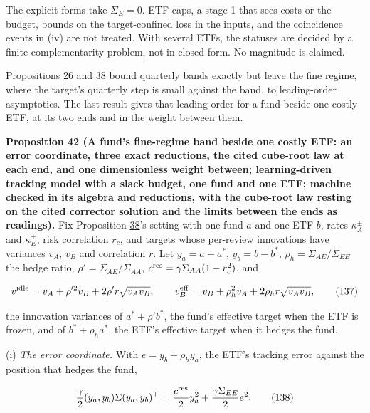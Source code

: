 \documentclass[11pt]{article}
\begin{document}
The explicit forms take \(\Sigma_E=0\). ETF caps, a stage 1 that sees costs or
the budget, bounds on the target-confined loss in the inputs, and the
coincidence events in (iv) are not treated. With several ETFs, the
statuses are decided by a finite complementarity problem, not in
closed form. No magnitude is claimed.

Propositions \hyperref[res:Proposition-26]{26} and \hyperref[res:Proposition-38]{38} bound quarterly bands exactly but leave the
fine regime, where the target's quarterly step is small against the
band, to leading-order asymptotics. The last result gives that leading
order for a fund beside one costly ETF, at its two ends and in the
weight between them.

\label{res:Proposition-42}
\textbf{Proposition 42 (A fund's fine-regime band beside one costly ETF: an error coordinate, three exact reductions, the cited cube-root law at each end, and one dimensionless weight between; learning-driven tracking model with a slack budget, one fund and one ETF; machine checked in its algebra and reductions, with the cube-root law resting on the cited corrector solution and the limits between the ends as readings).}
Fix Proposition \hyperref[res:Proposition-38]{38}'s setting with one fund \(a\) and one ETF
\(b\), rates \(\kappa^\pm_A\) and \(\kappa^\pm_E\), risk correlation \(r_c\), and targets whose
per-review innovations have variances \(v_A\), \(v_B\) and correlation \(r\). Let
\(y_a=a-a^*\), \(y_b=b-b^*\), \(\rho_h=\Sigma_{AE}/\Sigma_{EE}\) the hedge ratio, \(\rho'=\Sigma_{AE}/\Sigma_{AA}\),
\(c^{\rm res}=\gamma\Sigma_{AA}(1-r_c^2)\), and

\begin{equation*}
v^{\rm idle}=v_A+\rho'^2v_B+2\rho'r\sqrt{v_Av_B},\qquad
v_B^{\rm eff}=v_B+\rho_h^2v_A+2\rho_hr\sqrt{v_Av_B},\tag{137}\label{eq:137}
\end{equation*}

the innovation variances of \(a^*+\rho'b^*\), the fund's effective target when
the ETF is frozen, and of \(b^*+\rho_ha^*\), the ETF's effective target when it
hedges the fund.

(i) \emph{The error coordinate.} With \(e=y_b+\rho_hy_a\), the ETF's tracking error
against the position that hedges the fund,

\begin{equation*}
\frac\gamma2(y_a,y_b)\Sigma(y_a,y_b)^\top=\frac{c^{\rm res}}2y_a^2+\frac{\gamma\Sigma_{EE}}2e^2.\tag{138}\label{eq:138}
\end{equation*}
\end{document}
